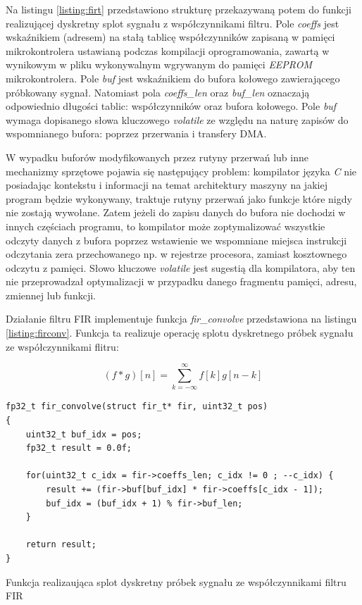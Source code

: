 Na listingu \ref{listing:firt} przedstawiono strukturę przekazywaną potem do funkcji realizującej dyskretny splot sygnału z
współczynnikami filtru. Pole \textit{coeffs} jest wskaźnikiem (adresem) na stałą tablicę współczynników zapisaną w pamięci
mikrokontrolera ustawianą podczas kompilacji oprogramowania, zawartą w wynikowym w pliku wykonywalnym wgrywanym do pamięci 
\textit{EEPROM} mikrokontrolera. Pole \textit{buf} jest wskaźnikiem do bufora kołowego zawierającego próbkowany sygnał.
Natomiast pola \textit{coeffs\_len} oraz \textit{buf\_len} oznaczają odpowiednio długości tablic: 
współczynników oraz bufora kołowego.
Pole \textit{buf} wymaga dopisanego słowa kluczowego \textit{volatile} ze względu na naturę zapisów do wspomnianego bufora: poprzez
przerwania i transfery DMA. 


W wypadku buforów modyfikowanych przez rutyny przerwań lub inne mechanizmy sprzętowe 
pojawia się następujący problem: kompilator języka \textit{C} nie posiadając kontekstu i informacji na temat architektury maszyny
na jakiej program będzie wykonywany, traktuje rutyny przerwań jako funkcje które nigdy nie zostają wywołane. Zatem jeżeli do zapisu
danych do bufora nie dochodzi w innych częściach programu, to kompilator może zoptymalizować wszystkie odczyty danych 
z bufora poprzez wstawienie we wspomniane miejsca instrukcji odczytania zera przechowanego np. w rejestrze procesora, 
zamiast kosztownego odczytu z pamięci. Słowo kluczowe \textit{volatile} jest sugestią dla kompilatora, aby ten nie przeprowadzał
optymalizacji w przypadku danego fragmentu pamięci, adresu, zmiennej lub funkcji.


Działanie filtru FIR implementuje funkcja \textit{fir\_convolve} przedstawiona na listingu \ref{listing:firconv}. 
Funkcja ta realizuje operację splotu dyskretnego próbek sygnału ze współczynnikami flitru:

$$
(f * g)[n] = \sum_{k=-\infty}^{\infty} f[k]g[n-k]
$$

\begin{listing}
\begin{verbatim}
fp32_t fir_convolve(struct fir_t* fir, uint32_t pos)
{ 
    uint32_t buf_idx = pos; 
    fp32_t result = 0.0f;
  
    for(uint32_t c_idx = fir->coeffs_len; c_idx != 0 ; --c_idx) { 
        result += (fir->buf[buf_idx] * fir->coeffs[c_idx - 1]);
        buf_idx = (buf_idx + 1) % fir->buf_len;
    }     
  
    return result;
} 
\end{verbatim} 
\caption{Funkcja realizaująca splot dyskretny próbek sygnału ze współczynnikami filtru FIR}
\label{listing:firconv}
\end{listing}

